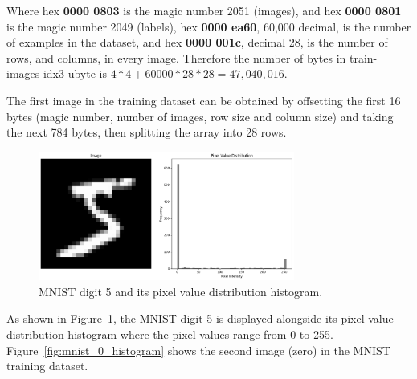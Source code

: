 


Where hex \textbf{0000 0803} is the magic number 2051 (images), and hex \textbf{0000 0801} is the magic number 2049 (labels), hex \textbf{0000 ea60}, 60,000 decimal, is the number of examples in the dataset, and hex \textbf{0000 001c}, decimal 28, is the number of rows, and columns, in every image. Therefore the number of bytes in train-images-idx3-ubyte is $4 * 4 + 60000 * 28 * 28 = 47,040,016$.

The first image in the training dataset can be obtained by offsetting the first 16 bytes (magic number, number of images, row size and column size) and taking the next 784 bytes, then splitting the array into 28 rows.


\begin{figure}[h]
    \centering
    \includegraphics[width=0.75\textwidth]{Figures/Methods/MNIST_5_with_histogram.png}
    \caption{MNIST digit 5 and its pixel value distribution histogram.}
    \label{fig:mnist_5_histogram}
\end{figure}
As shown in Figure~\ref{fig:mnist_5_histogram}, the MNIST digit 5 is displayed alongside its pixel value distribution histogram where the pixel values range from 0 to 255. Figure~\ref{fig:mnist_0_histogram} shows the second image (zero) in the MNIST training dataset.

